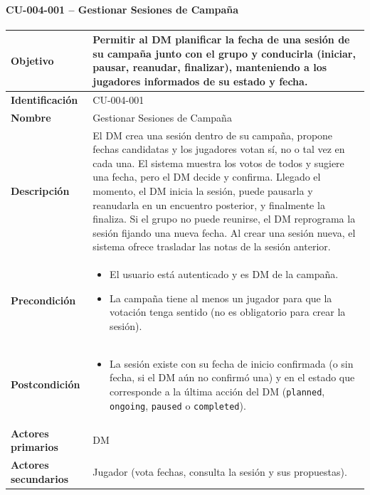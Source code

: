 \paragraph{CU-004-001 -- Gestionar Sesiones de Campaña}
{\small\setlength{\tabcolsep}{5pt}\renewcommand{\arraystretch}{1.2}
\begin{longtable}{|>{\raggedright\arraybackslash\bfseries}p{3.2cm}|>{\raggedright\arraybackslash}p{11.9cm}|}
\hline
Objetivo & Permitir al DM planificar la fecha de una sesión de su campaña junto con el grupo y conducirla (iniciar, pausar, reanudar, finalizar), manteniendo a los jugadores informados de su estado y fecha. \\ \hline
Identificación & CU-004-001 \\ \hline
Nombre & Gestionar Sesiones de Campaña \\ \hline
Descripción & El DM crea una sesión dentro de su campaña, propone fechas candidatas y los jugadores votan sí, no o tal vez en cada una. El sistema muestra los votos de todos y sugiere una fecha, pero el DM decide y confirma. Llegado el momento, el DM inicia la sesión, puede pausarla y reanudarla en un encuentro posterior, y finalmente la finaliza. Si el grupo no puede reunirse, el DM reprograma la sesión fijando una nueva fecha. Al crear una sesión nueva, el sistema ofrece trasladar las notas de la sesión anterior. \\ \hline
Precondición & \begin{itemize}[itemsep=2pt,topsep=2pt]
\item El usuario está autenticado y es DM de la campaña.
\item La campaña tiene al menos un jugador para que la votación tenga sentido (no es obligatorio para crear la sesión).
\end{itemize} \\ \hline
Postcondición & \begin{itemize}[itemsep=2pt,topsep=2pt]
\item La sesión existe con su fecha de inicio confirmada (o sin fecha, si el DM aún no confirmó una) y en el estado que corresponde a la última acción del DM (\texttt{planned}, \texttt{ongoing}, \texttt{paused} o \texttt{completed}).
\end{itemize} \\ \hline
Actores primarios & DM \\ \hline
Actores secundarios & Jugador (vota fechas, consulta la sesión y sus propuestas). \\ \hline

\end{longtable}}

